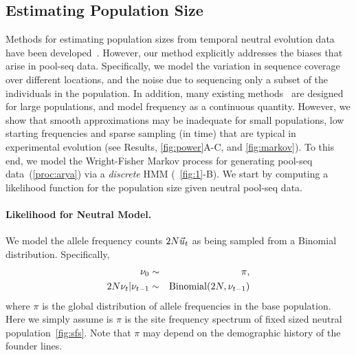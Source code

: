 \subsection{Estimating Population Size}
Methods for estimating population sizes from temporal neutral
evolution data have been
developed~\cite{williamson1999using,anderson2000monte,
  bollback2008estimation, Terhorst2015Multi,jonas2016estimating}.
However, our method explicitly addresses the biases that arise in
pool-seq data. Specifically, we model the variation in sequence
coverage over different locations, and the noise due to sequencing
only a subset of the individuals in the population.  In addition, many
existing
methods~\cite{bollback2008estimation,feder2014Identifying,topa2015gaussian,Terhorst2015Multi}
are designed for large populations, and model frequency as a
continuous quantity. However, we show that smooth approximations may
be inadequate for small populations, low starting frequencies and
sparse sampling (in time) that are typical in experimental evolution
(see Results, \ref{fig:power}A-C, and \ref{fig:markov}). To this end,
we model the Wright-Fisher Markov process for generating pool-seq
data~(\ref{proc:arya}) via a \emph{discrete} HMM (~\ref{fig:1}-B). We
start by computing a likelihood function for the population size given
neutral pool-seq data.


\paragraph{Likelihood for Neutral Model.}
We model the allele frequency counts $2N\vec{u}_t$ as being sampled from a
Binomial distribution. Specifically,
\begin{eqnarray*} 
  \nu_0 &\sim& \pi,\\
  2N\nu_t|\nu_{t-1} &\sim& \operatorname{Binomial}(2N,\nu_{t-1}) 
\end{eqnarray*}
where $\pi$ is the global distribution of allele frequencies in the
base population. Here we simply assume is $\pi$ is the site frequency
spectrum of fixed sized neutral population~\ref{fig:sfs}. Note that $\pi$ may depend on the
demographic history of the founder lines.


